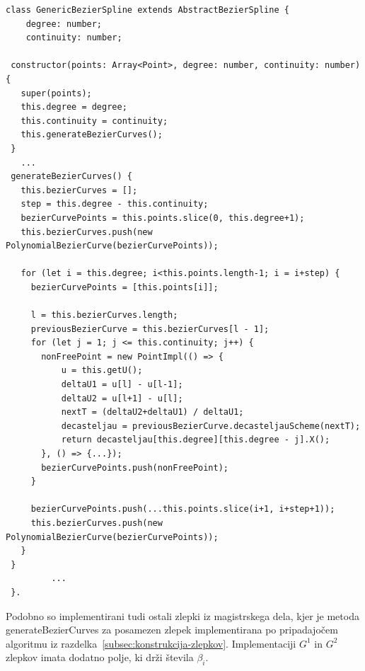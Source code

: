 \documentclass[isrm2, tisk]{fmfdelo}
\begin{document}
    \begin{lstlisting}[label={lst:zlepek}]
class GenericBezierSpline extends AbstractBezierSpline {
    degree: number;
    continuity: number;

 constructor(points: Array<Point>, degree: number, continuity: number) {
   super(points);
   this.degree = degree;
   this.continuity = continuity;
   this.generateBezierCurves();
 }
   ...
 generateBezierCurves() {
   this.bezierCurves = [];
   step = this.degree - this.continuity;
   bezierCurvePoints = this.points.slice(0, this.degree+1);
   this.bezierCurves.push(new PolynomialBezierCurve(bezierCurvePoints));

   for (let i = this.degree; i<this.points.length-1; i = i+step) {
     bezierCurvePoints = [this.points[i]];

     l = this.bezierCurves.length;
     previousBezierCurve = this.bezierCurves[l - 1];
     for (let j = 1; j <= this.continuity; j++) {
       nonFreePoint = new PointImpl(() => {
           u = this.getU();
           deltaU1 = u[l] - u[l-1];
           deltaU2 = u[l+1] - u[l];
           nextT = (deltaU2+deltaU1) / deltaU1;
           decasteljau = previousBezierCurve.decasteljauScheme(nextT);
           return decasteljau[this.degree][this.degree - j].X();
       }, () => {...});
       bezierCurvePoints.push(nonFreePoint);
     }

     bezierCurvePoints.push(...this.points.slice(i+1, i+step+1));
     this.bezierCurves.push(new PolynomialBezierCurve(bezierCurvePoints));
   }
 }
         ...
 }.
    \end{lstlisting}
    Podobno so implementirani tudi ostali zlepki iz magistrskega dela, kjer je metoda generateBezierCurves za posamezen zlepek implementirana po pripadajočem algoritmu iz razdelka~\ref{subsec:konstrukcija-zlepkov}.
    Implementaciji $G^1$ in $G^2$ zlepkov imata dodatno polje, ki drži števila $\beta_i$.
\end{document}
